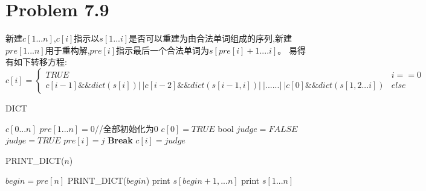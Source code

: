 \documentclass[onecolumn]{ctexart}
\begin{document}

\section*{Problem 7.9}
\indent 新建$c[1...n]$,$c[i]$指示以$s[1...i]$是否可以重建为由合法单词组成的序列,新建$pre[1...n]$用于重构解,$pre[i]$指示最后一个合法单词为$s[pre[i]+1....i]$。
\indent 易得有如下转移方程:
\[
c[i]=
\begin{cases}
TRUE & i==0\\
c[i-1]\&\&dict(s[i])|\ |c[i-2]\&\&dict(s[i-1,i])|\ |......|\ |c[0]\&\&dict(s[1,2...i]) &else
\end{cases}
\] 
\begin{algorithm}[htbp]
	\caption{DICT}
	\label{DICT}
	\begin{algorithmic}[1]
		\STATE $c[0...n]$
		\STATE $pre[1...n]={0}$//全部初始化为0
		\STATE $c[0]=TRUE$
			\STATE bool $judge=FALSE$
					\STATE $judge=TRUE$
					\STATE $pre[i]=j$
				\STATE \textbf{Break}
				\ENDIF
				\STATE $c[i]=judge$
			\ENDFOR
		\ENDFOR
	\end{algorithmic}
\end{algorithm}

\begin{algorithm}[htbp]
	\caption{PRINT\_DICT($n$)}
	\label{PrintDICT}
	\begin{algorithmic}[1]
		\STATE $begin=pre[n]$
			\STATE PRINT\_DICT($begin$)
			\STATE print $s[begin+1,...n]$
		\ELSE
			\STATE print $s[1...n]$
		\ENDIF
	\end{algorithmic}
\end{algorithm}
\end{document}
